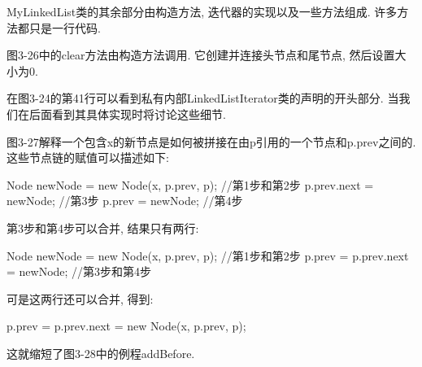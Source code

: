 \documentclass[oneside]{ctexbook}
\begin{document}
MyLinkedList类的其余部分由构造方法, 迭代器的实现以及一些方法组成. 许多方法都只是一行代码.

图3-26中的clear方法由构造方法调用. 它创建并连接头节点和尾节点, 然后设置大小为0.

在图3-24的第41行可以看到私有内部LinkedListIterator类的声明的开头部分. 当我们在后面看到其具体实现时将讨论这些细节.

图3-27解释一个包含x的新节点是如何被拼接在由p引用的一个节点和p.prev之间的. 这些节点链的赋值可以描述如下:

\begin{myjava}{}{}
Node newNode = new Node(x, p.prev, p); //第1步和第2步
p.prev.next = newNode;                 //第3步
p.prev = newNode;                      //第4步
\end{myjava}

第3步和第4步可以合并, 结果只有两行:

\begin{myjava}{}{}
Node newNode = new Node(x, p.prev, p); //第1步和第2步
p.prev = p.prev.next = newNode;        //第3步和第4步
\end{myjava}

可是这两行还可以合并, 得到:

\begin{myjava}{}{}
p.prev = p.prev.next = new Node(x, p.prev, p);
\end{myjava}

这就缩短了图3-28中的例程addBefore.
\end{document}
